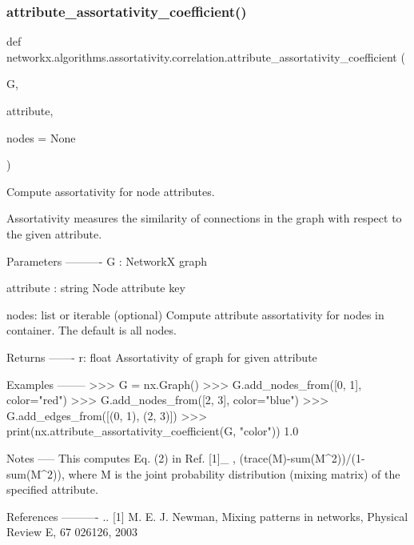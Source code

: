 \subsubsection{\texorpdfstring{attribute\+\_\+assortativity\+\_\+coefficient()}{attribute\_assortativity\_coefficient()}}
{\footnotesize\ttfamily def networkx.\+algorithms.\+assortativity.\+correlation.\+attribute\+\_\+assortativity\+\_\+coefficient (\begin{DoxyParamCaption}\item[{}]{G,  }\item[{}]{attribute,  }\item[{}]{nodes = {\ttfamily None} }\end{DoxyParamCaption})}

\begin{DoxyVerb}Compute assortativity for node attributes.

Assortativity measures the similarity of connections
in the graph with respect to the given attribute.

Parameters
----------
G : NetworkX graph

attribute : string
    Node attribute key

nodes: list or iterable (optional)
    Compute attribute assortativity for nodes in container.
    The default is all nodes.

Returns
-------
r: float
   Assortativity of graph for given attribute

Examples
--------
>>> G = nx.Graph()
>>> G.add_nodes_from([0, 1], color="red")
>>> G.add_nodes_from([2, 3], color="blue")
>>> G.add_edges_from([(0, 1), (2, 3)])
>>> print(nx.attribute_assortativity_coefficient(G, "color"))
1.0

Notes
-----
This computes Eq. (2) in Ref. [1]_ , (trace(M)-sum(M^2))/(1-sum(M^2)),
where M is the joint probability distribution (mixing matrix)
of the specified attribute.

References
----------
.. [1] M. E. J. Newman, Mixing patterns in networks,
   Physical Review E, 67 026126, 2003
\end{DoxyVerb}
 \mbox{\label{namespacenetworkx_1_1algorithms_1_1assortativity_1_1correlation_aa4d4adbe8aae494852d6561d6f3cb0dc}} 
